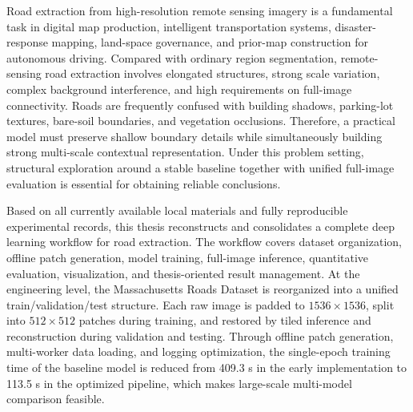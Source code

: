 \begin{abstract}
本文工作的主要贡献体现在三个方面。第一，完成了原始实验工程的系统重建，并通过离线 patch 数据集和多进程数据加载显著降低了训练阶段的数据瓶颈，建立了适合多模型统一评估的实验平台。第二，围绕 U-Net 主干形成了以 DLGU-Net 为主线模型、以空洞卷积增强基线为直接改进分支、以 Vanilla U-Net 等为扩展探索分支的完整实验矩阵，保证了模型分析具有足够广度。第三，将全部结论统一建立在整图验证和整图测试协议之上，形成了数据导向、结构清晰、可复核的模型比较体系。研究结果表明，在当前数据规模和任务特征下，以稳定 baseline 为锚点开展轻量、直接、可控的结构增强，是获得持续性能收益的有效路径。

\end{abstract}

\begin{abstract*}
Road extraction from high-resolution remote sensing imagery is a fundamental task in digital map production, intelligent transportation systems, disaster-response mapping, land-space governance, and prior-map construction for autonomous driving. Compared with ordinary region segmentation, remote-sensing road extraction involves elongated structures, strong scale variation, complex background interference, and high requirements on full-image connectivity. Roads are frequently confused with building shadows, parking-lot textures, bare-soil boundaries, and vegetation occlusions. Therefore, a practical model must preserve shallow boundary details while simultaneously building strong multi-scale contextual representation. Under this problem setting, structural exploration around a stable baseline together with unified full-image evaluation is essential for obtaining reliable conclusions.

Based on all currently available local materials and fully reproducible experimental records, this thesis reconstructs and consolidates a complete deep learning workflow for road extraction. The workflow covers dataset organization, offline patch generation, model training, full-image inference, quantitative evaluation, visualization, and thesis-oriented result management. At the engineering level, the Massachusetts Roads Dataset is reorganized into a unified train/validation/test structure. Each raw image is padded to $1536 \times 1536$, split into $512 \times 512$ patches during training, and restored by tiled inference and reconstruction during validation and testing. Through offline patch generation, multi-worker data loading, and logging optimization, the single-epoch training time of the baseline model is reduced from 409.3 s in the early implementation to 113.5 s in the optimized pipeline, which makes large-scale multi-model comparison feasible.


\end{abstract*}

